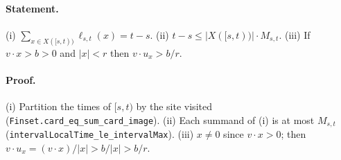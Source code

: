 \paragraph{Statement.} (i) $\sum_{x\in X([s,t))}\ell_{s,t}(x)=t-s$. (ii)
$t-s\le|X([s,t))|\cdot M_{s,t}$. (iii) If $v\cdot x>b>0$ and $|x|<r$ then $v\cdot u_x>b/r$.
\paragraph{Proof.} (i) Partition the times of $[s,t)$ by the site visited
(\texttt{Finset.card\_eq\_sum\_card\_image}). (ii) Each summand of (i) is at most $M_{s,t}$
(\texttt{intervalLocalTime\_le\_intervalMax}). (iii) $x\ne0$ since $v\cdot x>0$; then
$v\cdot u_x=(v\cdot x)/|x|>b/|x|>b/r$.
